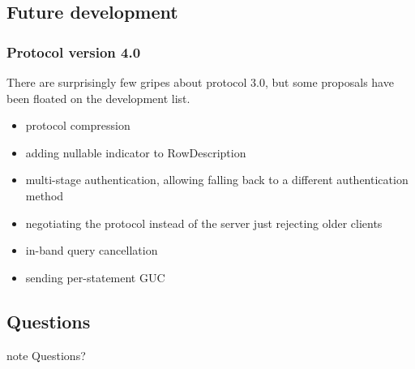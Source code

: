 \documentclass{beamer}
\begin{document}
\subsection{Future development}
\begin{frame}
  \frametitle{Protocol version 4.0}

  There are surprisingly few gripes about protocol 3.0, but some proposals have
  been floated on the development list.

  \begin{itemize}
  \item protocol compression
  \item adding nullable indicator to RowDescription
  \item multi-stage authentication, allowing falling back to a different
    authentication method
  \item negotiating the protocol instead of the server just rejecting older
    clients
  \item in-band query cancellation
  \item sending per-statement GUC
  \end{itemize}
\end{frame}

\subsection*{Questions}

\begin{frame}
\begin{beamercolorbox}[center]{note}
  \Huge Questions?
\end{beamercolorbox}
\end{frame}
\end{document}
